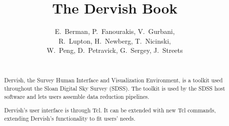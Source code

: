 %
%
%
\title{The Dervish Book}
%
%
\author{E.~Berman, P.~Fanourakis, V.~Gurbani,\\
R.~Lupton, H.~Newberg, T.~Nicinski,\\
W.~Peng, D.~Petravick, G.~Sergey, J.~Streets\\
\ }
%
%
\begin{abstract}
Dervish, the Survey Human Interface and Visualization Environment, is a toolkit
used throughout the Sloan Digital Sky Survey (SDSS).
The toolkit is used by the SDSS host software and lets users assemble data
reduction pipelines.

Dervish's user interface is through Tcl.  It can be extended with new Tcl
commands, extending Dervish's functionality to fit users' needs.
\end{abstract}
%
